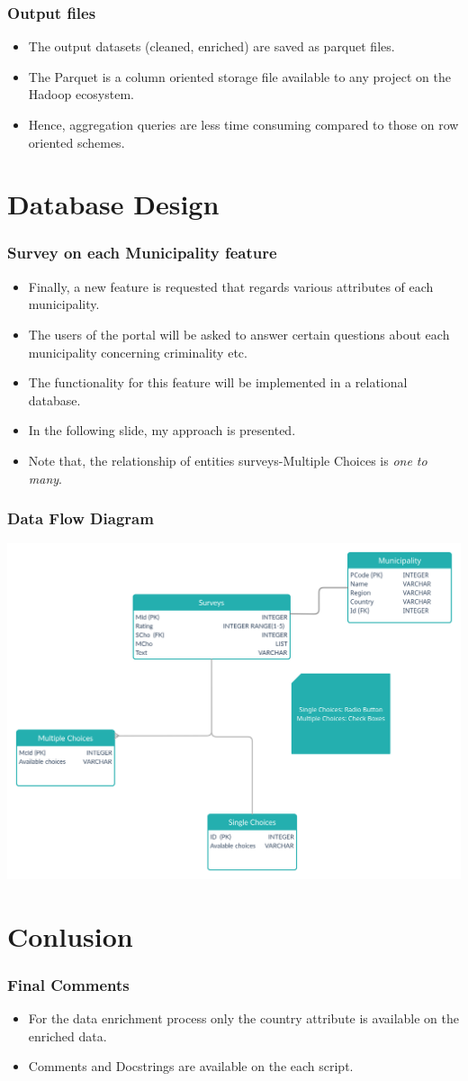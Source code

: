 \documentclass{beamer}
\begin{document}
\begin{frame}
\frametitle{Output files}
\begin{itemize}
\item The output datasets (cleaned, enriched) are saved as parquet files.
\item The Parquet is a column oriented storage file available to any project on the Hadoop ecosystem.
\item Hence, aggregation queries are less time consuming compared to those on row oriented schemes. 
\end{itemize}
\end{frame}

\section{Database Design}
\begin{frame}
\frametitle{Survey on each Municipality feature}
\begin{itemize}
\item Finally, a new feature is requested that regards various attributes of each municipality.
\item The users of the portal will be asked to answer certain questions about each municipality concerning criminality etc.
\item The functionality for this feature will be implemented in a relational database.
\item In the following slide, my approach is presented.
\item Note that, the relationship of entities surveys-Multiple Choices is \textit{one to many}. 
\end{itemize}
\end{frame}

\begin{frame}
\frametitle{Data Flow Diagram}
\centering
\includegraphics[scale=0.13]{ERD.png}
\end{frame}

\section{Conlusion}
\begin{frame}
\frametitle{Final Comments}
\begin{itemize}
\item For the data enrichment process only the country attribute is available on the enriched data.
\item Comments and Docstrings are available on the each script.
\end{itemize}
\end{frame}
\end{document}
